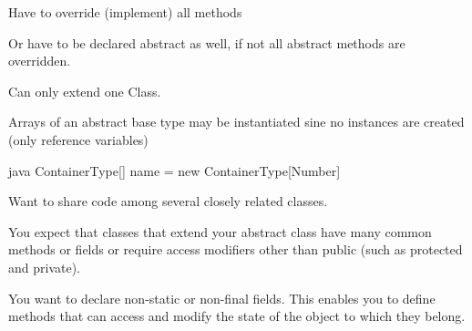 \begin{notebox}\nospacing
  \begin{itemizenosep}
      \item Have to override (implement) all  methods
      \item Or have to be declared abstract as well, if not all abstract methods
    are overridden.
      \item Can only extend one Class.
  \end{itemizenosep}
\end{notebox}
\begin{notebox}[Note]\nospacing
  Arrays of an abstract base type may be instantiated sine no instances are
  created (only reference variables)
  \begin{mintlinebox}{java}
    ContainerType[] name = new ContainerType[Number]
  \end{mintlinebox}
\end{notebox}
\begin{stylebox}[Usage]\nospacing
  \begin{itemizenosep}
      \item Want to share code among several closely related classes.
      \item You expect that classes that extend your abstract class have many
    common methods or fields or require access modifiers other than public (such
    as protected and private).
      \item You want to declare non-static or non-final fields. This enables you to define methods that can access and modify the state of the object to which they belong.
  \end{itemizenosep}
\end{stylebox}
